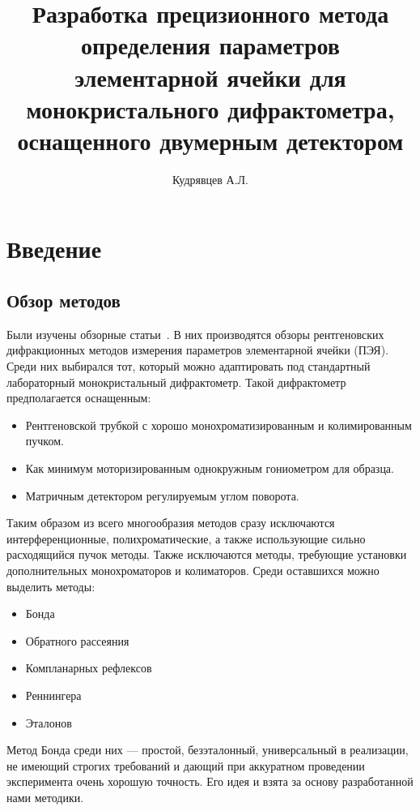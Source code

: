 \documentclass[a4paper,14pt]{extarticle}
\author{Кудрявцев А.Л.}
\title{Разработка прецизионного метода определения параметров элементарной ячейки для монокристального дифрактометра, оснащенного двумерным детектором}
\begin{document}
\maketitle
\newpage
\tableofcontents
\newpage
\section{Введение}
\subsection{Обзор методов}

Были изучены обзорные статьи~\cite{Lider:2020,Galdecka:2006}.
В них производятся обзоры рентгеновских дифракционных методов измерения параметров элементарной ячейки (ПЭЯ).
Среди них выбирался тот, который можно адаптировать под стандартный лабораторный монокристальный дифрактометр.
Такой дифрактометр предполагается оснащенным:
\begin{itemize}
    \item Рентгеновской трубкой с хорошо монохроматизированным и колимированным пучком.
    \item Как минимум моторизированным однокружным гониометром для образца.
    \item Матричным детектором регулируемым углом поворота.
\end{itemize}
Таким образом из всего многообразия методов сразу исключаются интерференционные, полихроматические, а также использующие сильно расходящийся пучок методы. Также исключаются методы, требующие установки дополнительных монохроматоров и колиматоров.
Среди оставшихся можно выделить методы:
\begin{itemize}
    \item Бонда
    \item Обратного рассеяния
    \item Компланарных рефлексов
    \item Реннингера
    \item Эталонов
\end{itemize}
Метод Бонда среди них --- простой, безэталонный, универсальный в реализации, не имеющий строгих требований и дающий при аккуратном проведении эксперимента очень хорошую точность.
Его идея и взята за основу разработанной нами методики.
\end{document}
